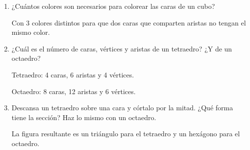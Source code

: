 \begin{enumerate}
	
	\item ¿Cuántos colores son necesarios para colorear las caras de un cubo?
	
	Con 3 colores distintos para que dos caras que comparten aristas no tengan el mismo color.
	
	\item ¿Cuál es el número de caras, vértices y aristas de un tetraedro? ¿Y de un octaedro?
	
	Tetraedro: 4 caras, 6 aristas y 4 vértices.
	
	Octaedro: 8 caras, 12 aristas y  6 vértices.
	
	\item Descansa un tetraedro sobre una cara y córtalo por la mitad. ¿Qué forma tiene la sección? Haz lo mismo con un octaedro.
	
	La figura resultante es un triángulo para el tetraedro y un hexágono para el octaedro.
	
	
	\begin{figure}[H]
		\centering
	\end{figure}
	

\end{enumerate}
